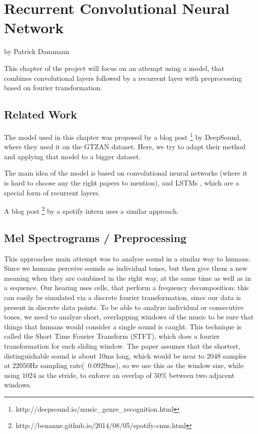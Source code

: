 \def\code#1{\mbox{\texttt{#1}}}


\chapter{Recurrent Convolutional Neural Network}
by Patrick Dammann

\bigskip

This chapter of the project will focus on an attempt using a model, that combines convolutional layers followed by a recurrent layer with preprocessing based on fourier transformation.

\section{Related Work}
\label{sec:rcnn-related}
The model used in this chapter was proposed by a blog post
\footnote{http://deepsound.io/music\_genre\_recognition.html}
by DeepSound, where they used it on the GTZAN \cite{1021072} dataset. Here, we try to adapt their method and applying that model to a bigger dataset.

The main idea of the model is based on convolutional neural networks (where it is hard to choose any the right papers to mention), and LSTMs \cite{Hochreiter:1997:LSM:1246443.1246450}, which are a special form of recurrent layers.

A blog post \footnote{http://benanne.github.io/2014/08/05/spotify-cnns.html} by a spotify intern uses a similar approach.

\section{Mel Spectrograms / Preprocessing}
\label{sec:rcnn-mels}

This approaches main attempt was to analyse sound in a similar way to humans. Since we humans perceive sounds as individual tones, but then give them a new meaning when they are combined in the right way, at the same time as well as in a sequence. Our hearing uses cells, that perform a frequency decomposition: this can easily be simulated via a discrete fourier transformation, since our data is present in discrete data points. To be able to analyze individual or consecutive tones, we need to analyze short, overlapping windows of the music to be sure that things that humans would consider a single sound is caught. This technique is called the Short Time Fourier Transform (STFT), which does a fourier transformation for each sliding window. The paper assumes that the shortest, distinguishable sound is about 10ms long, which would be near to $2048$ samples at $22050$Hz sampling rate(~0.0929ms), so we use this as the window size, while using $1024$ as the stride, to enforce an overlap of $50\%$ between two adjacent windows.

